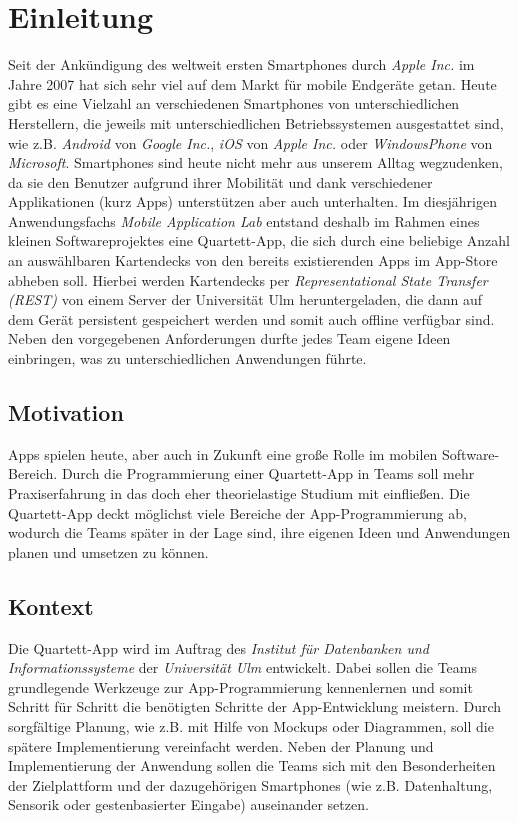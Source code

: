 \chapter{Einleitung}
\label{cha:einleitung}

Seit der Ankündigung des weltweit ersten Smartphones durch \textit{Apple Inc.} im Jahre 2007 hat sich sehr viel auf dem Markt für mobile Endgeräte getan. Heute gibt es eine Vielzahl an verschiedenen Smartphones von unterschiedlichen Herstellern, die jeweils mit unterschiedlichen Betriebssystemen ausgestattet sind, wie z.B. \textit{Android} von \textit{Google Inc.}, \textit{iOS} von \textit{Apple Inc.} oder \textit{WindowsPhone} von \textit{Microsoft}. Smartphones sind heute nicht mehr aus unserem Alltag wegzudenken, da sie den Benutzer aufgrund ihrer Mobilität und dank verschiedener Applikationen (kurz \glqq Apps\grqq) unterstützen aber auch unterhalten. Im diesjährigen Anwendungsfachs \textit{Mobile Application Lab} entstand deshalb im Rahmen eines kleinen Softwareprojektes eine Quartett-App, die sich durch eine beliebige Anzahl an auswählbaren Kartendecks von den bereits existierenden Apps im App-Store abheben soll. Hierbei werden Kartendecks per \textit{Representational State Transfer (REST)} von einem Server der Universität Ulm heruntergeladen, die dann auf dem Gerät persistent gespeichert werden und somit auch offline verfügbar sind. Neben den vorgegebenen Anforderungen durfte jedes Team eigene Ideen einbringen, was zu unterschiedlichen Anwendungen führte.

\section{Motivation}
\label{sec:motivation}

Apps spielen heute, aber auch in Zukunft eine große Rolle im mobilen Software-Bereich. Durch die Programmierung einer Quartett-App in Teams soll mehr Praxiserfahrung in das doch eher theorielastige Studium mit einfließen. Die Quartett-App deckt möglichst viele Bereiche der App-Programmierung ab, wodurch die Teams später in der Lage sind, ihre eigenen Ideen und Anwendungen planen und umsetzen zu können.

\section{Kontext}
\label{sec:kontext}

Die Quartett-App wird im Auftrag des \textit{Institut für Datenbanken und Informationssysteme} der \textit{Universität Ulm} entwickelt. Dabei sollen die Teams grundlegende Werkzeuge zur App-Programmierung kennenlernen und somit Schritt für Schritt die benötigten Schritte der App-Entwicklung meistern. Durch sorgfältige Planung, wie z.B. mit Hilfe von Mockups oder Diagrammen, soll die spätere Implementierung vereinfacht werden. Neben der Planung und Implementierung der Anwendung sollen die Teams sich mit den Besonderheiten der Zielplattform und der dazugehörigen Smartphones (wie z.B. Datenhaltung, Sensorik oder gestenbasierter Eingabe) auseinander setzen.


